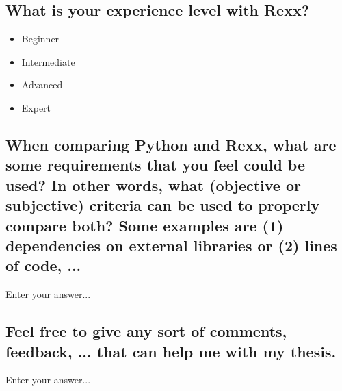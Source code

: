 \subsection{What is your experience level with Rexx?}
\begin{itemize}
    \item Beginner
    \item Intermediate
    \item Advanced
    \item Expert
\end{itemize}

\subsection{When comparing Python and Rexx, what are some requirements that you feel could be used? In other words, what (objective or subjective) criteria can be used to properly compare both? Some examples are (1) dependencies on external libraries or (2) lines of code, ...}
Enter your answer...

\subsection{Feel free to give any sort of comments, feedback, ... that can help me with my thesis.}
Enter your answer...
